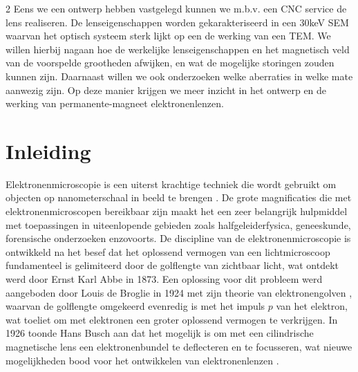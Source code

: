\documentclass[we,twoside,openright,a4paper,11pt]{uantwerpenbamathesis}
\begin{document}
\begin{multicols}{2}
Eens we een ontwerp hebben vastgelegd kunnen we m.b.v. een CNC service de lens realiseren. De lenseigenschappen worden gekarakteriseerd in een 30keV SEM waarvan het optisch systeem sterk lijkt op een de werking van een TEM. We willen hierbij nagaan hoe de werkelijke lenseigenschappen en het magnetisch veld van de voorspelde grootheden afwijken, en wat de mogelijke storingen zouden kunnen zijn. Daarnaast willen we ook onderzoeken welke aberraties in welke mate aanwezig zijn. Op deze manier krijgen we meer inzicht in het ontwerp en de werking van permanente-magneet elektronenlenzen.
\end{multicols}
\makeatother

\pagestyle{fancy}

\chapter{Inleiding}
Elektronenmicroscopie is een uiterst krachtige techniek die wordt gebruikt om objecten op nanometerschaal in beeld te brengen \cite{EM_Overview}. De grote magnificaties die met elektronenmicroscopen bereikbaar zijn maakt het een zeer belangrijk hulpmiddel met toepassingen in uiteenlopende gebieden zoals halfgeleiderfysica, geneeskunde, forensische onderzoeken enzovoorts. De discipline van de elektronenmicroscopie is ontwikkeld na het besef dat het oplossend vermogen van een lichtmicroscoop fundamenteel is gelimiteerd door de golflengte van zichtbaar licht, wat ontdekt werd door Ernst Karl Abbe in 1873. Een oplossing voor dit probleem werd aangeboden door Louis de Broglie in 1924 met zijn theorie van elektronengolven \cite{deBroglie1924}, waarvan de golflengte omgekeerd evenredig is met het impuls $p$ van het elektron, wat toeliet om met elektronen een groter oplossend vermogen te verkrijgen. In 1926 toonde Hans Busch aan dat het mogelijk is om met een cilindrische magnetische lens een elektronenbundel te deflecteren en te focusseren, wat nieuwe mogelijkheden bood voor het ontwikkelen van elektronenlenzen \cite{Busch1926}.\\
\end{document}
